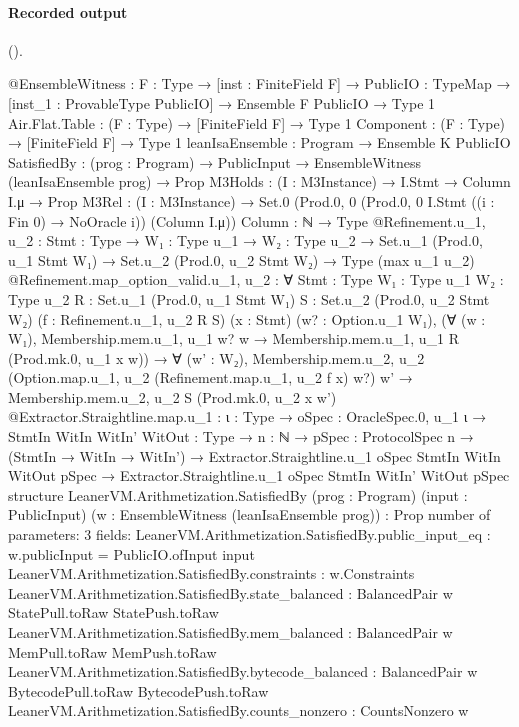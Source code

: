 \paragraph{Recorded output} ().
\begin{srccode}[numbers=left,numbersep=3pt]
@EnsembleWitness : {F : Type} →
  [inst : FiniteField F] → {PublicIO : TypeMap} → [inst_1 : ProvableType PublicIO] → Ensemble F PublicIO → Type 1
Air.Flat.Table : (F : Type) → [FiniteField F] → Type 1
Component : (F : Type) → [FiniteField F] → Type 1
leanIsaEnsemble : Program → Ensemble K PublicIO
SatisfiedBy : (prog : Program) → PublicInput → EnsembleWitness (leanIsaEnsemble prog) → Prop
M3Holds : (I : M3Instance) → I.Stmt → Column I.μ → Prop
M3Rel : (I : M3Instance) → Set.{0} (Prod.{0, 0} (Prod.{0, 0} I.Stmt ((i : Fin 0) → NoOracle i)) (Column I.μ))
Column : ℕ → Type
@Refinement.{u_1,
    u_2} : {Stmt : Type} →
  {W₁ : Type u_1} →
    {W₂ : Type u_2} → Set.{u_1} (Prod.{0, u_1} Stmt W₁) → Set.{u_2} (Prod.{0, u_2} Stmt W₂) → Type (max u_1 u_2)
@Refinement.map_option_valid.{u_1,
    u_2} : ∀ {Stmt : Type} {W₁ : Type u_1} {W₂ : Type u_2} {R : Set.{u_1} (Prod.{0, u_1} Stmt W₁)}
  {S : Set.{u_2} (Prod.{0, u_2} Stmt W₂)} (f : Refinement.{u_1, u_2} R S) (x : Stmt) (w? : Option.{u_1} W₁),
  (∀ (w : W₁), Membership.mem.{u_1, u_1} w? w → Membership.mem.{u_1, u_1} R (Prod.mk.{0, u_1} x w)) →
    ∀ (w' : W₂),
      Membership.mem.{u_2, u_2} (Option.map.{u_1, u_2} (Refinement.map.{u_1, u_2} f x) w?) w' →
        Membership.mem.{u_2, u_2} S (Prod.mk.{0, u_2} x w')
@Extractor.Straightline.map.{u_1} : {ι : Type} →
  {oSpec : OracleSpec.{0, u_1} ι} →
    {StmtIn WitIn WitIn' WitOut : Type} →
      {n : ℕ} →
        {pSpec : ProtocolSpec n} →
          (StmtIn → WitIn → WitIn') →
            Extractor.Straightline.{u_1} oSpec StmtIn WitIn WitOut pSpec →
              Extractor.Straightline.{u_1} oSpec StmtIn WitIn' WitOut pSpec
structure LeanerVM.Arithmetization.SatisfiedBy (prog : Program) (input : PublicInput)
  (w : EnsembleWitness (leanIsaEnsemble prog)) : Prop
number of parameters: 3
fields:
  LeanerVM.Arithmetization.SatisfiedBy.public_input_eq : w.publicInput = PublicIO.ofInput input
  LeanerVM.Arithmetization.SatisfiedBy.constraints : w.Constraints
  LeanerVM.Arithmetization.SatisfiedBy.state_balanced : BalancedPair w StatePull.toRaw StatePush.toRaw
  LeanerVM.Arithmetization.SatisfiedBy.mem_balanced : BalancedPair w MemPull.toRaw MemPush.toRaw
  LeanerVM.Arithmetization.SatisfiedBy.bytecode_balanced : BalancedPair w BytecodePull.toRaw BytecodePush.toRaw
  LeanerVM.Arithmetization.SatisfiedBy.counts_nonzero : CountsNonzero w

\end{srccode}
